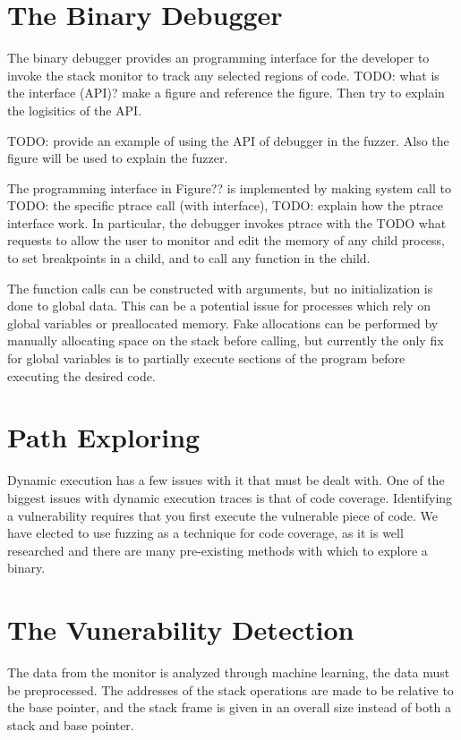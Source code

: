 \documentclass{article}
\begin{document}

\section{The Binary Debugger}

The binary debugger provides an programming interface for the developer to invoke the stack monitor 
to track any selected regions of code.  TODO: what is the interface (API)? make a figure and reference the figure. Then try to explain the logisitics of the API.


TODO: provide an example of using the API of debugger in the fuzzer. Also the figure will be used to explain the fuzzer. 


The programming interface in Figure?? is implemented by making system call to TODO: the specific ptrace call (with interface), TODO: explain how the ptrace interface work. In particular, the debugger invokes ptrace with the TODO {what requests} to allow the user to monitor and edit the memory of any child process, 
to set breakpoints in a child, and to call any function in the child. 

The function calls can be
constructed with arguments, but no initialization is done to global data. This
can be a potential issue for processes which rely on global variables or
preallocated memory. Fake allocations can be performed by manually allocating
space on the stack before calling, but currently the only fix for global
variables is to partially execute sections of the program before executing the
desired code.


\section {Path Exploring} Dynamic execution has a few issues with it that must
be dealt with. One of the biggest issues with dynamic execution traces is that
of code coverage. Identifying a vulnerability requires that you first execute
the vulnerable piece of code. We have elected to use fuzzing as a technique for
code coverage, as it is well researched and there are many pre-existing methods
with which to explore a binary.

\section {The Vunerability Detection} The data from the monitor is analyzed
through machine learning, the data must be preprocessed. The addresses of the
stack operations are made to be relative to the base pointer, and the stack
frame is given in an overall size instead of both a stack and base pointer.
\end{document}
